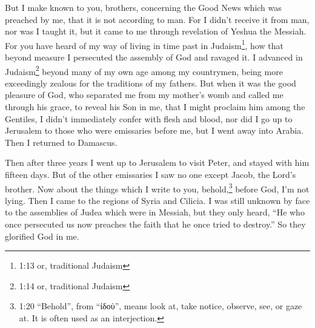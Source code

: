 \myverse{}But I make known to you, brothers, concerning the Good News which
was preached by me, that it is not according to man.
\myverse{}For I didn’t receive it from man, nor was I taught it, but it came to me through
revelation of Yeshua the Messiah.
\myverse{}For you have heard of my way of living in time past in Judaism\footnote{1:13 or, traditional Judaism},
how that beyond measure I persecuted the assembly of God and ravaged it.
\myverse{}I advanced in Judaism\footnote{1:14 or, traditional Judaism} beyond many
of my own age among my countrymen, being more exceedingly zealous for the traditions of my fathers.
\myverse{}But when it was the good pleasure of God, who separated me from my mother’s
womb and called me through his grace,
\myverse{}to reveal his Son in me, that I might proclaim him among the Gentiles, I didn’t
immediately confer with flesh and blood,
\myverse{}nor did I go up to Jerusalem to those who were emissaries before me, but I
went away into Arabia. Then I returned to Damascus.

\myverse{}Then after three years I went up to Jerusalem to visit Peter,
and stayed with him fifteen days.
\myverse{}But of the other emissaries I saw no one except Jacob, the Lord’s brother.
\myverse{}Now about the things which I write to you, behold,\footnote{1:20 “Behold”, from “ἰδοὺ”, means look at, take notice, observe, see, or gaze at. It is often used
	as an interjection.} before God, I’m not lying.
\myverse{}Then I came to the regions of Syria and Cilicia.
\myverse{}I was still unknown by face to the assemblies of Judea which were in Messiah,
\myverse{}but they only heard, “He who once persecuted us now preaches the faith that
he once tried to destroy.”
\myverse{}So they glorified God in me.


